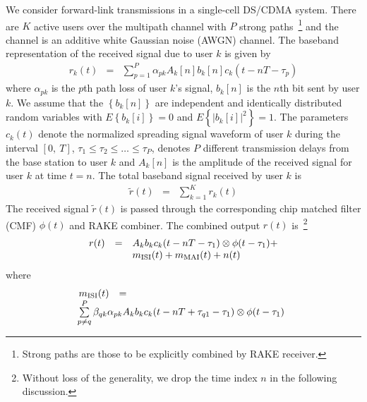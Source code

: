 \documentclass[a4paper,10pt,fleqn, twocolumn]{IEEETran}
\begin{document}
We consider forward-link transmissions in a single-cell DS/CDMA
system. There are $K$ active users over the multipath channel with
$P$ strong paths~\footnote{Strong paths are those to be explicitly
combined by RAKE receiver.} and the channel is an additive white
Gaussian noise (AWGN) channel. The baseband representation of the
received signal due to user $k$ is given by
\begin{equation}
\begin{array}{rcl}
r_k(t)&=&\sum\limits_{p=1}^{P}\alpha_{pk}A_k[n]
b_k[n]c_k(t-nT-\tau_p)
\end{array}
\end{equation}
\noindent where $\alpha_{pk}$ is the $p$th path loss of user $k$'s
signal, $b_k{[n]}$ is the $n$th bit sent by user $k$. We assume
that the $\left\{b_k{[n]}\right\}$ are independent and identically
distributed random variables with $E\left\{b_k{[i]}\right\}=0$ and
$E\left\{|b_k{[i]}|^2\right\}=1$. The parameters $c_k(t)$ denote
the normalized spreading signal waveform of user $k$ during the
interval $[0,\ T]$, $\tau_1\leq\tau_2\leq\ldots\leq\tau_P$,
denotes $P$ different transmission delays from the base station to
user $k$ and $A_k[n]$ is the amplitude of the received signal for
user $k$ at time $t=n$. The total baseband signal received by user
$k$ is
\begin{equation}
\begin{array}{rcl}
\tilde{r}(t)&=&\sum\limits_{k=1}^{K}r_k(t)
\end{array}
\end{equation}
The received signal $\tilde{r}(t)$ is passed through the
corresponding chip matched filter (CMF) $\phi(t)$ and RAKE
combiner. The combined output $r(t)$ is~\footnote{Without loss of
the generality, we drop the time index $n$ in the following
discussion.}
\begin{equation}\hspace{-0.0in}
\begin{array}{rcl}
r(t)&=&A_k b_k c_k(t-nT-\tau_1)\otimes \phi(t-\tau_1)+ \\
&&\hspace{0.0in} m_{\rm ISI}(t) + m_{\rm MAI}(t) + n(t)
\end{array}\label{r_t}
\end{equation}
\noindent where
\begin{equation} \hspace{-0.05in}
\begin{array}{rcl}
 m_{\rm ISI}(t)&=&\\
 &&\hspace{-0.83in}\sum\limits^{P}_{p\neq
q}\beta_{qk} \alpha_{pk}A_kb_kc_k(t-nT+\tau_{q1}-\tau_1)\otimes
\phi(t-\tau_1)
\end{array}
\end{equation}
\end{document}
